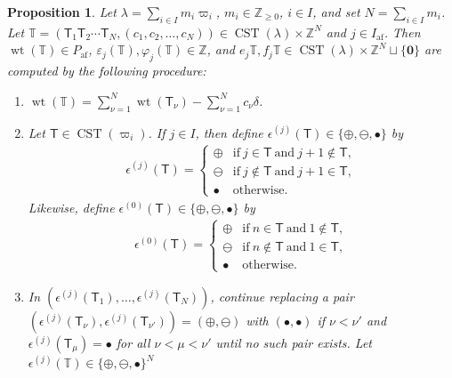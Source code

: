 \documentclass[10pt]{amsart}
\newtheorem{prop}[theo]{Proposition}
\theoremstyle{definition}\newtheorem{defi}[theo]{Definition}
\theoremstyle{remark}\newtheorem{rema}[theo]{Remark}
\newcommand{\BZ}{\mathbb{Z}}
\newcommand\bm[1]{\boldsymbol{#1}}
\DeclareMathOperator{\af}{af}
\DeclareMathOperator{\wt}{wt}
\DeclareMathOperator{\CST}{CST}
\begin{document}
\begin{prop} \label{prop:crystal-str-SiYT}
Let 
$\lambda = \sum_{i \in I} m_i \varpi_i$, 
$m_i \in \BZ_{\geq 0}$, $i \in I$, 
and set 
$N = \sum_{i \in I} m_i$.
Let 
$\mathbb{T} = (\mathsf{T}_1 \mathsf{T}_2 \cdots \mathsf{T}_N , (c_1 , c_2 , \ldots , c_N)) 
\in \CST (\lambda) \times \BZ^N$ 
and 
$j \in I_{\af}$. 
Then 
$\wt (\mathbb{T}) \in P_{\af}$, 
$\varepsilon_j(\mathbb{T}) , \varphi_j(\mathbb{T}) \in \BZ$, and 
$e_j \mathbb{T} , f_j \mathbb{T} \in \CST (\lambda) \times \BZ^N \sqcup \{ \bm{0} \}$
are computed by the following procedure: 
\begin{enumerate}[label=(\roman*)]
\item
$\wt (\mathbb{T}) = \sum_{\nu = 1}^N \wt (\mathsf{T}_{\nu}) - \sum_{\nu = 1}^N c_{\nu} \delta$. 
\item
Let
$\mathsf{T} \in \CST (\varpi_i)$. 
If $j \in I$, then define 
$\epsilon^{(j)}(\mathsf{T}) \in \{ \bm{\oplus}, \bm{\ominus}, \bullet \}$ 
by 
\begin{align}
\epsilon^{(j)}(\mathsf{T})
=
\begin{cases}
\bm{\oplus} & \text{if} \ j \in \mathsf{T} \ \text{and} \ j+1 \notin \mathsf{T}, \\
\bm{\ominus} & \text{if} \ j \notin \mathsf{T} \ \text{and} \ j+1 \in \mathsf{T}, \\
\bullet & \text{otherwise}.
\end{cases}
\end{align}
Likewise, define
$\epsilon^{(0)}(\mathsf{T}) \in \{ \bm{\oplus}, \bm{\ominus}, \bullet \}$ 
by 
\begin{align}
\epsilon^{(0)}(\mathsf{T})
=
\begin{cases}
\bm{\oplus} & \text{if} \ n \in \mathsf{T} \ \text{and} \ 1 \notin \mathsf{T}, \\
\bm{\ominus} & \text{if} \ n \notin \mathsf{T} \ \text{and} \ 1 \in \mathsf{T}, \\
\bullet & \text{otherwise}.
\end{cases}
\end{align}
\item
In 
$\left( \epsilon^{(j)}(\mathsf{T}_1) , \ldots , \epsilon^{(j)}(\mathsf{T}_N) \right)$, 
continue replacing a pair 
$\left( \epsilon^{(j)}(\mathsf{T}_{\nu}) , \epsilon^{(j)}(\mathsf{T}_{\nu'}) \right) = (\bm{\oplus},\bm{\ominus})$ 
with 
$(\bullet , \bullet)$ 
if 
$\nu < \nu'$ 
and 
$\epsilon^{(j)}(\mathsf{T}_{\mu}) = \bullet$ 
for all 
$\nu < \mu < \nu'$ 
until no such pair exists. 
Let 
$\epsilon^{(j)}(\mathbb{T}) \in \{ \bm{\oplus},\bm{\ominus}, \bullet \}^N$

\end{enumerate}
\end{prop}
\end{document}
